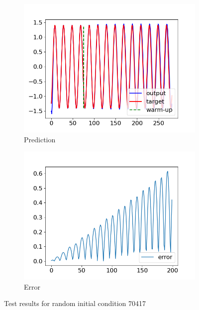 \begin{figure}[h]
	\centering
	\begin{subfigure}[b]{0.45\textwidth}
		\includegraphics[width=\textwidth]{../Results/Test-Task02/Figures/RNN-lstm-RDIM_1-N_used_50000-NUM-LAY_1-SIZE-LAY_100-ACT_tanh-ISH_statefull-SL_8-PL_4-LR_0.001-DKP_1.0-ZKP_1.0-HSPL_300-IPL_200-NL_1-WID_0/prediction_augmend_TEST_70417.png}
		\caption{Prediction}
	\end{subfigure}
	\begin{subfigure}[b]{0.45\textwidth}
		\includegraphics[width=\textwidth]{../Results/Test-Task02/Figures/RNN-lstm-RDIM_1-N_used_50000-NUM-LAY_1-SIZE-LAY_100-ACT_tanh-ISH_statefull-SL_8-PL_4-LR_0.001-DKP_1.0-ZKP_1.0-HSPL_300-IPL_200-NL_1-WID_0/prediction_TEST_70417_error.png}
		\caption{Error}
	\end{subfigure}
	\caption{Test results for random initial condition 70417}
	\label{2:predictions1}
\end{figure}
